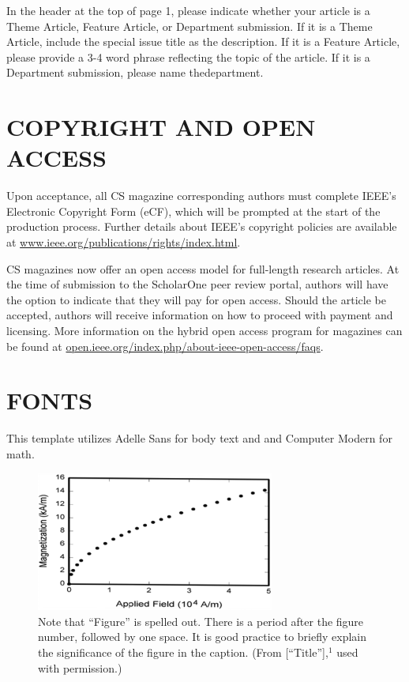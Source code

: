 \documentclass{IEEEcsmag}
\begin{document}
In the header at the top of page 1, please indicate whether your article is a Theme Article, Feature Article, or Department submission. If it is a Theme Article, include the special issue title as the description. If it is a Feature Article, please provide a 3-4 word phrase reflecting the topic of the article. If it is a Department submission, please name the\break department.\vadjust{\pagebreak} 

\section{COPYRIGHT AND OPEN ACCESS}

Upon acceptance, all CS magazine corresponding authors must complete IEEE's Electronic Copyright Form (eCF), which will be prompted at the start of the production process. Further details about IEEE's copyright policies are available at \href{https://www.ieee.org/publications/rights/index.html}{www.ieee.org/publications/rights/index.html}. 

CS magazines now offer an open access model for full-length research articles. At the time of submission to the ScholarOne peer review portal, authors will have the option to indicate that they will pay for open access. Should the article be accepted, authors will receive information on how to proceed with payment and licensing. More information on the hybrid open access program for magazines can be found at \href{https://open.ieee.org/index.php/about-ieee-open-access/faqs}{open.ieee.org/index.php/about-ieee-open-access/faqs}.\vspace*{-10pt}


\section{FONTS}

This template utilizes Adelle Sans for body text and and Computer Modern for math.\vspace*{-5pt}

\begin{figure}
\centerline{\includegraphics[width=18.5pc]{fig1.jpg}}
\caption{Note that ``Figure'' is spelled out. There is a period after the figure number, followed by one space. It is good practice to briefly explain the significance of the figure in the caption. (From [``Title''],$^1$ used with permission.)}\vspace*{-5pt}
\end{figure}
\end{document}
